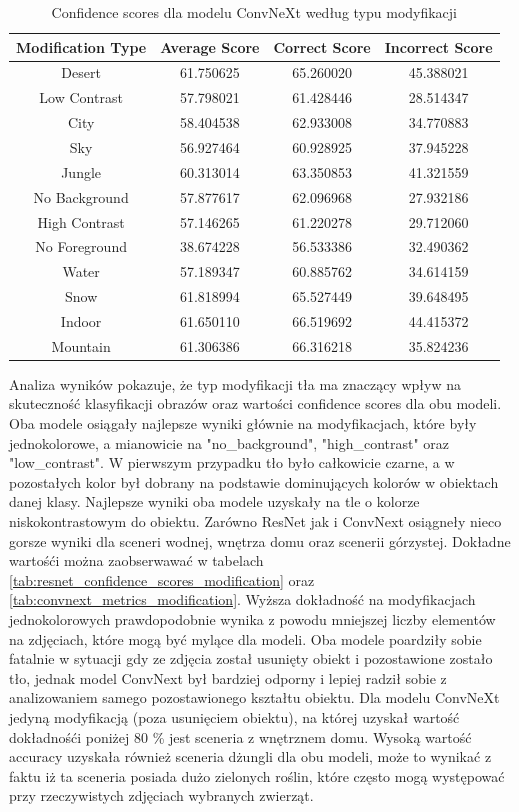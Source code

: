 \begin{table}
	\centering
	\begin{tabular}{|c|c|c|c|}
		\hline
		\textbf{Modification Type} & \textbf{Average Score} & \textbf{Correct Score} & \textbf{Incorrect Score} \\
		\hline
		Desert & 61.750625 & 65.260020 & 45.388021 \\
		\hline
		Low Contrast & 57.798021 & 61.428446 & 28.514347 \\
		\hline
		City & 58.404538 & 62.933008 & 34.770883 \\
		\hline
		Sky & 56.927464 & 60.928925 & 37.945228 \\
		\hline
		Jungle & 60.313014 & 63.350853 & 41.321559 \\
		\hline
		No Background & 57.877617 & 62.096968 & 27.932186 \\
		\hline
		High Contrast & 57.146265 & 61.220278 & 29.712060 \\
		\hline
		No Foreground & 38.674228 & 56.533386 & 32.490362 \\
		\hline
		Water & 57.189347 & 60.885762 & 34.614159 \\
		\hline
		Snow & 61.818994 & 65.527449 & 39.648495 \\
		\hline
		Indoor & 61.650110 & 66.519692 & 44.415372 \\
		\hline
		Mountain & 61.306386 & 66.316218 & 35.824236 \\
		\hline
	\end{tabular}
	\caption{Confidence scores dla modelu ConvNeXt według typu modyfikacji}
	\label{tab:convnext_confidence_scores_modification}
\end{table}

Analiza wyników pokazuje, że typ modyfikacji tła ma znaczący wpływ na skuteczność klasyfikacji obrazów oraz wartości confidence scores dla obu modeli. Oba modele osiągały najlepsze wyniki głównie na modyfikacjach, które były jednokolorowe, a mianowicie na "no\_background", "high\_contrast"
oraz "low\_contrast". W pierwszym przypadku tło było całkowicie czarne, a w pozostałych kolor był dobrany na podstawie dominujących kolorów w obiektach danej klasy. Najlepsze wyniki oba modele uzyskały na tle o kolorze niskokontrastowym do obiektu. Zarówno ResNet jak i ConvNext
osiągneły nieco gorsze wyniki dla sceneri wodnej, wnętrza domu oraz scenerii górzystej. Dokładne wartośći można zaobserwawać w tabelach \ref*{tab:resnet_confidence_scores_modification} oraz \ref*{tab:convnext_metrics_modification}. Wyższa dokładność na modyfikacjach jednokolorowych prawdopodobnie wynika z powodu mniejszej liczby elementów na 
zdjęciach, które mogą być mylące dla modeli. Oba modele poardziły sobie fatalnie w sytuacji gdy ze zdjęcia został usunięty obiekt i pozostawione zostało tło, jednak model ConvNext był bardziej odporny i lepiej radził sobie z analizowaniem samego pozostawionego kształtu obiektu. Dla modelu
ConvNeXt jedyną modyfikacją (poza usunięciem obiektu), na której uzyskał wartość dokładnośći poniżej 80 \% jest sceneria z wnętrznem domu. Wysoką wartość accuracy uzyskała również sceneria dżungli dla obu modeli, może to wynikać z faktu iż ta sceneria posiada dużo zielonych roślin,
które często mogą występować przy rzeczywistych zdjęciach wybranych zwierząt.

